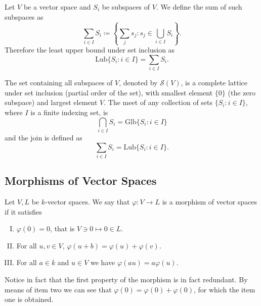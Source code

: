\begin{definition}\label{def: sum of subspaces}
    Let \(V\) be a vector space and \(S_i\) be subspaces of \(V\). We define the
    sum of such subspaces as
    \[
        \sum_{i \in I} S_i \coloneq \left\{\sum_j s_j \colon s_j \in \bigcup_{i \in  I}
        S_i\right\}.
    \]
    Therefore the least upper bound under set inclusion as
    \[
        \mathrm{Lub}\{S_i \colon i \in I\} = \sum_{i \in I} S_i.
    \]
\end{definition}

\begin{theorem}
    \label{thm: subspaces form a lattice}
    The set containing all subspaces of \(V\), denoted by \(\mathcal{S}(V)\), is
    a complete lattice under set inclusion (partial order of the set), with
    smallest element \(\{0\}\) (the zero subspace) and largest element \(V\). The
    meet of any collection of sets \(\{S_i \colon i \in I\}\), where \(I\) is a finite
    indexing set, is
    \[
        \bigcap_{i \in  I} S_i = \mathrm{Glb}\{S_i \colon i \in I\}
    \]
    and the join is defined as
    \[
        \sum_{i \in I} S_i = \mathrm{Lub}\{S_i \colon i \in I\}.
    \]
\end{theorem}

\subsection{Morphisms of Vector Spaces}

\begin{definition}[Morphisms]\label{def: k-linear morphism}
    Let \(V, L\) be \(k\)-vector spaces. We say that \(\varphi : V \to L\) is a
    morphism of vector spaces if it satisfies
    \begin{enumerate}[I.]
        \item \(\varphi(0) = 0\), that is \(V \ni 0 \mapsto 0 \in L\).
        \item For all \(u, v \in V\), \(\varphi(u + b) = \varphi(u) +
              \varphi(v)\).
        \item For all \(a \in k\) and \(u \in V\) we have \(\varphi(au) =
              a\varphi(u)\).
    \end{enumerate}
\end{definition}

Notice in fact that the first property of the morphism is in fact redundant. By
means of item two we can see that \(\varphi(0) = \varphi(0) + \varphi(0)\), for
which the item one is obtained.

